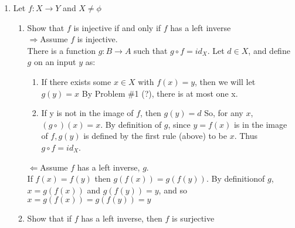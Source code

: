 \documentclass[11pt]{article}
\begin{document}
\begin{enumerate}
\item Let $f:X \to Y$ and $X \neq \phi$
\begin{enumerate}
\item Show that $f$ is injective if and only if $f$ has a left inverse\\
$\Rightarrow$Assume $f$ is injective.\\
There is a function $g:B \to A$ such that $g \circ f = id_X$.  Let $d \in X$, and define $g$ on an input $y$ as:
\begin{enumerate}
\item If there exists some $x \in X$ with $f(x) = y$, then we will let $g(y) = x$  By Problem \#1 (?), there is at most one x.
\item If y is not in the image of $f$, then $g(y) = d$
So, for any $x$, $(g \circ)(x) = x$.  By definition of $g$, since $y = f(x)$ is in the image of $f, g(y)$ is defined by the first rule (above) to be $x$.  Thus $g \circ f = id_X$. 
\end{enumerate} %
$\Leftarrow$Assume $f$ has a left inverse, $g$.\\
If $f(x) = f(y)$ then $g(f(x)) = g(f(y))$. By definitionof $g$, $x = g(f(x))$ and $g(f(y)) = y$, and so $x = g(f(x)) = g(f(y)) = y$\\
\item Show that if $f$ has a left inverse, then $f$ is surjective\\
\end{enumerate} %

\end{enumerate} %
\end{document}
